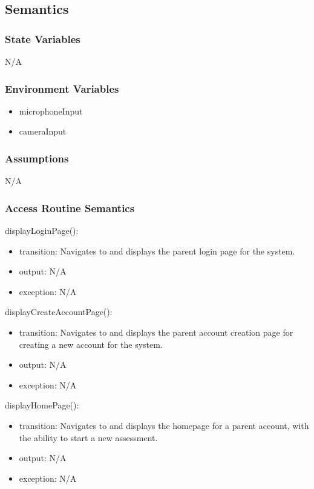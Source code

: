 \documentclass[12pt, titlepage]{article}
\begin{document}
\subsection{Semantics}

\subsubsection{State Variables}
N/A

\subsubsection{Environment Variables}
\begin{itemize}
  \item microphoneInput
  \item cameraInput
\end{itemize}

\subsubsection{Assumptions}
N/A

\subsubsection{Access Routine Semantics}

\noindent displayLoginPage():
\begin{itemize}
\item transition: Navigates to and displays the parent login page for the system.
\item output: N/A
\item exception: N/A
\end{itemize}

\noindent displayCreateAccountPage():
\begin{itemize}
\item transition: Navigates to and displays the parent account creation page for creating a new account for the system.
\item output: N/A
\item exception: N/A
\end{itemize}

\noindent displayHomePage():
\begin{itemize}
\item transition: Navigates to and displays the homepage for a parent account, with the ability to start a new assessment.
\item output: N/A
\item exception: N/A
\end{itemize}
\end{document}
